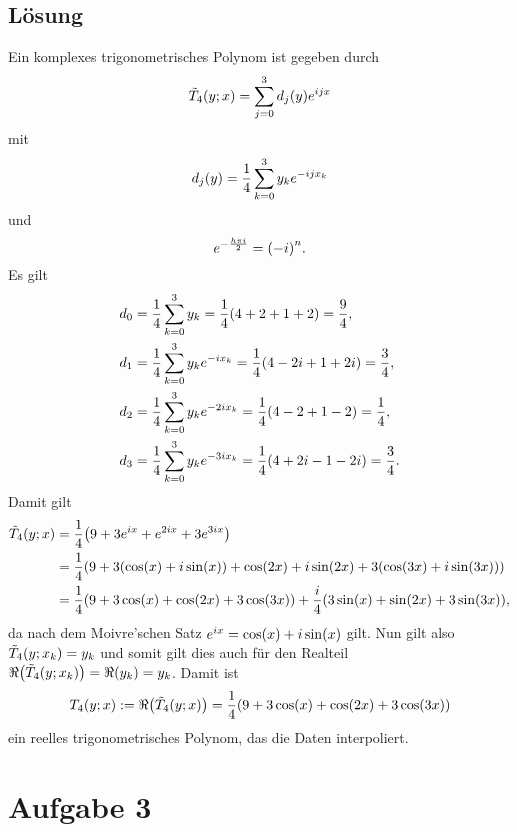 \documentclass{exercise}
\begin{document}
    \subsection*{Lösung}
    Ein komplexes trigonometrisches Polynom ist gegeben durch
    \[
        \tilde{T}_4\parentheses*{y; x} = \sum_{j = 0}^3 d_j\parentheses*{y}e^{ijx}
    \]
    mit
    \[
        d_j\parentheses*{y} = \frac{1}{4}\sum_{k = 0}^3 y_k e^{-ijx_k}
    \]
    und
    \[
        e^{-\frac{h\pi i}{2}} = \parentheses*{-i}^n.
    \]
    Es gilt
    \begin{align*}
        d_0 &= \frac{1}{4}\sum_{k = 0}^3 y_k = \frac{1}{4}\parentheses*{4 + 2 + 1 + 2} = \frac{9}{4},\\
        d_1 &= \frac{1}{4}\sum_{k = 0}^3 y_k e^{-ix_k} = \frac{1}{4}\parentheses*{4 - 2i + 1 + 2i} = \frac{3}{4},\\
        d_2 &= \frac{1}{4}\sum_{k = 0}^3 y_k e^{-2ix_k} = \frac{1}{4}\parentheses*{4 - 2 + 1 - 2} = \frac{1}{4},\\
        d_3 &= \frac{1}{4}\sum_{k = 0}^3 y_k e^{-3ix_k} = \frac{1}{4}\parentheses*{4 + 2i - 1 - 2i} = \frac{3}{4}.
    \end{align*}
    Damit gilt
    \begin{align*}
        \tilde{T}_4\parentheses*{y; x} &= \frac{1}{4}\parentheses*{9 + 3e^{ix} + e^{2ix} + 3e^{3ix}}\\
        &= \frac{1}{4}\parentheses*{9 + 3\parentheses*{\cos\parentheses*{x} + i\sin\parentheses*{x}} + \cos\parentheses*{2x} + i\sin\parentheses*{2x} + 3\parentheses*{\cos\parentheses*{3x} + i\sin\parentheses*{3x}}}\\
        &= \frac{1}{4}\parentheses*{9 + 3\cos\parentheses*{x} + \cos\parentheses*{2x} + 3\cos\parentheses*{3x}} + \frac{i}{4}\parentheses*{3\sin\parentheses*{x} + \sin\parentheses*{2x} + 3\sin\parentheses*{3x}},
    \end{align*}
    da nach dem Moivre'schen Satz \(e^{ix} = \cos\parentheses*{x} + i\sin\parentheses*{x}\) gilt.
    Nun gilt also \(\tilde{T}_4\parentheses*{y; x_k} = y_k\) und somit gilt dies auch für den Realteil \(\Re\parentheses*{\tilde{T}_4\parentheses*{y; x_k}} = \Re\parentheses*{y_k} = y_k\).
    Damit ist
    \[
        T_4\parentheses*{y; x} := \Re\parentheses*{\tilde{T}_4\parentheses*{y; x}} = \frac{1}{4}\parentheses*{9 + 3\cos\parentheses*{x} + \cos\parentheses*{2x} + 3\cos\parentheses*{3x}}
    \]
    ein reelles trigonometrisches Polynom, das die Daten interpoliert.


    \section*{Aufgabe 3}
\end{document}
